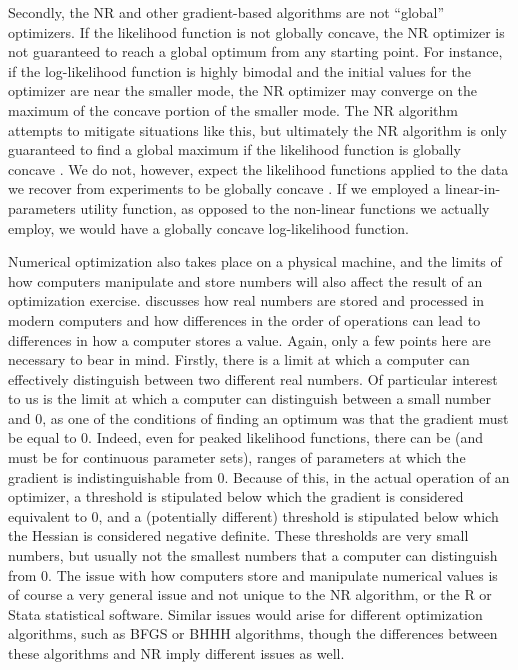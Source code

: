 \documentclass[../main.tex]{subfiles}
\begin{document}
Secondly, the NR and other gradient-based algorithms are not \enquote{global} optimizers.
If the likelihood function is not globally concave, the NR optimizer is not guaranteed to reach a global optimum from any starting point.
For instance, if the log-likelihood function is highly bimodal and the initial values for the optimizer are near the smaller mode, the NR optimizer may converge on the maximum of the concave portion of the smaller mode.
The NR algorithm attempts to mitigate situations like this{\footnotemark}, but ultimately the NR algorithm is only guaranteed to find a global maximum if the likelihood function is globally concave \parencite[218]{Train2002}.
We do not, however, expect the likelihood functions applied to the data we recover from experiments to be globally concave \parencite[227]{Train2002}.
If we employed a linear-in-parameters utility function, as opposed to the non-linear functions we actually employ, we would have a globally concave log-likelihood function.

\addtocounter{footnote}{-1}

Numerical optimization also takes place on a physical machine, and the limits of how computers manipulate and store numbers will also affect the result of an optimization exercise.
\textcite{Gould2006} discusses how real numbers are stored and processed in modern computers and how differences in the order of operations can lead to differences in how a computer stores a value.
Again, only a few points here are necessary to bear in mind.
Firstly, there is a limit at which a computer can effectively distinguish between two different real numbers.
Of particular interest to us is the limit at which a computer can distinguish between a small number and 0, as one of the conditions of finding an optimum was that the gradient must be equal to 0.{\footnotemark}
Indeed, even for peaked likelihood functions, there can be (and must be for continuous parameter sets), ranges of parameters at which the gradient is indistinguishable from 0.
Because of this, in the actual operation of an optimizer, a threshold is stipulated below which the gradient is considered equivalent to 0, and a (potentially different) threshold is stipulated below which the Hessian is considered negative definite.
These thresholds are very small numbers, but usually not the smallest numbers that a computer can distinguish from 0.
The issue with how computers store and manipulate numerical values is of course a very general issue and not unique to the NR algorithm, or the R or Stata statistical software.
Similar issues would arise for different optimization algorithms, such as BFGS or BHHH algorithms, though the differences between these algorithms and NR imply different issues as well.{\footnotemark}
\end{document}
